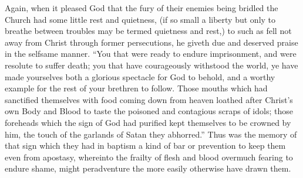 Again, when it pleased God that the fury of their enemies being bridled the Church had some little rest and quietness, (if so small a liberty but only to breathe between troubles may be termed quietness and rest,) to such as fell not away from Christ through former persecutions, he giveth due and deserved praise in the selfsame manner. “You that were ready to endure imprisonment, and were resolute to suffer death; you that have courageously withstood the world, ye have made yourselves both a glorious spectacle for God to behold, and a worthy example for the rest of your brethren to follow. Those mouths which had sanctified themselves with food coming down from heaven loathed after Christ’s own Body and Blood to taste the poisoned and contagious scraps of idols; those foreheads which the sign of God had purified kept themselves to be crowned by him, the touch of the garlands of Satan they abhorred.” Thus was the memory of that sign which they had in baptism a kind of bar or prevention to keep them even from apostasy, whereinto the frailty of flesh and blood overmuch fearing to endure shame, might peradventure the more easily otherwise have drawn them.

